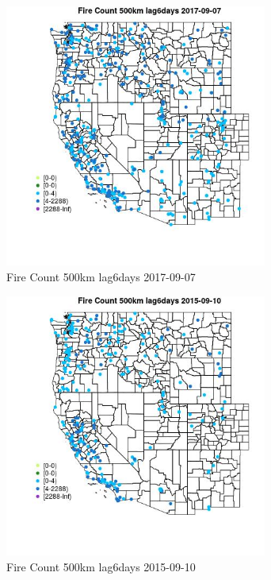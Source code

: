 \begin{figure} 
\centering  
\includegraphics[width=0.77\textwidth]{Code_Outputs/Report_ML_input_PM25_Step4_part_e_de_duplicated_aves_compiled_2019-05-20wNAs_MapObsFire_Count_500km_lag6days2017-09-07.jpg} 
\caption{\label{fig:Report_ML_input_PM25_Step4_part_e_de_duplicated_aves_compiled_2019-05-20wNAsMapObsFire_Count_500km_lag6days2017-09-07}Fire Count 500km lag6days 2017-09-07} 
\end{figure} 
 

\clearpage 

\begin{figure} 
\centering  
\includegraphics[width=0.77\textwidth]{Code_Outputs/Report_ML_input_PM25_Step4_part_e_de_duplicated_aves_compiled_2019-05-20wNAs_MapObsFire_Count_500km_lag6days2015-09-10.jpg} 
\caption{\label{fig:Report_ML_input_PM25_Step4_part_e_de_duplicated_aves_compiled_2019-05-20wNAsMapObsFire_Count_500km_lag6days2015-09-10}Fire Count 500km lag6days 2015-09-10} 
\end{figure} 
 

